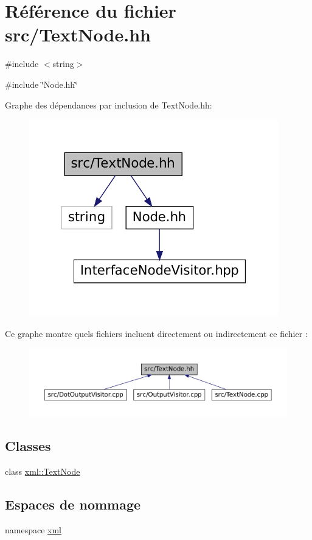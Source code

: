 \hypertarget{_text_node_8hh}{
\section{Référence du fichier src/TextNode.hh}
\label{_text_node_8hh}
}
{\ttfamily \#include $<$string$>$}\par
{\ttfamily \#include \char`\"{}Node.hh\char`\"{}}\par
Graphe des dépendances par inclusion de TextNode.hh:\nopagebreak
\begin{figure}[H]
\begin{center}
\leavevmode
\includegraphics[width=307pt]{_text_node_8hh__incl}
\end{center}
\end{figure}
Ce graphe montre quels fichiers incluent directement ou indirectement ce fichier :\nopagebreak
\begin{figure}[H]
\begin{center}
\leavevmode
\includegraphics[width=400pt]{_text_node_8hh__dep__incl}
\end{center}
\end{figure}
\subsection*{Classes}
\begin{DoxyCompactItemize}
\item 
class \hyperlink{classxml_1_1_text_node}{xml::TextNode}
\end{DoxyCompactItemize}
\subsection*{Espaces de nommage}
\begin{DoxyCompactItemize}
\item 
namespace \hyperlink{namespacexml}{xml}
\end{DoxyCompactItemize}
